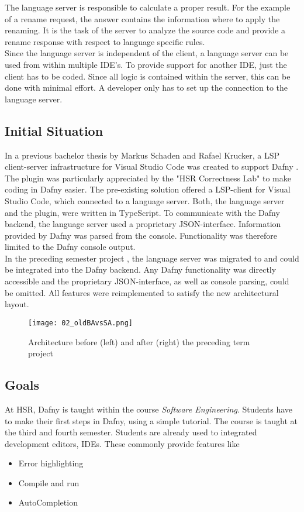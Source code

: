 The language server is responsible to calculate a proper result.
For the example of a rename request, the answer contains the information where to apply the renaming.
It is the task of the server to analyze the source code and provide a rename response with respect to language specific rules.\\

Since the language server is independent of the client, a language server can be used from within multiple IDE's.
To provide support for another IDE, just the client has to be coded.
Since all logic is contained within the server, this can be done with minimal effort.
A developer only has to set up the connection to the language server.



\subsection{Initial Situation}
\label{section:managment_summary:initialsolution}
In a previous bachelor thesis by Markus Schaden and Rafael Krucker, a LSP client-server infrastructure for Visual Studio Code was created to support Dafny \cite{ba}.
The plugin was particularly appreciated by the "HSR Correctness Lab" \cite{correctnessLab} to make coding in Dafny easier.
The pre-existing solution offered a LSP-client for Visual Studio Code, which connected to a language server.
Both, the language server and the plugin, were written in TypeScript.
To communicate with the Dafny backend, the language server used a proprietary JSON-interface.
Information provided by Dafny was parsed from the console.
Functionality was therefore limited to the Dafny console output.\\
In the preceding semester project \cite{sa}, the language server was migrated to \CsharpWithSpace and could be integrated into the Dafny backend.
Any Dafny functionality was directly accessible and the proprietary JSON-interface, as well as console parsing, could be omitted.
All features were reimplemented to satisfy the new architectural layout.

\begin{figure}[h]
    \centering
    \texttt{[image: 02\_oldBAvsSA.png]}
    \caption{Architecture before (left) and after (right) the preceding term project}
    \label{fig:oldBAvsSA}
\end{figure}


\subsection{Goals}
At HSR, Dafny is taught within the course \textit{Software Engineering}.
Students have to make their first steps in Dafny, using a simple tutorial.
The course is taught at the third and fourth semester.
Students are already used to integrated development editors, IDEs.
These commonly provide features like
\begin{itemize}
    \item Error highlighting
    \item Compile and run
    \item AutoCompletion
\end{itemize}

